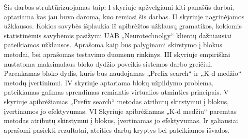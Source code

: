 Šis darbas struktūrizuojamas taip:
I skyriuje apžvelgiami kiti panašūs darbai, aptariama kas jau buvo daroma, kuo remiasi šis darbas.
II skyriuje nagrinėjamos užklausos.
Kokios savybės išplaukia iš apibrėžtos užklausų gramatikos, kokiomis statistinėmis savybėmis pasižymi UAB „Neurotechnolgy“ klientų dažniausiai pateikiamos užklausos.
Aprašoma kaip bus palyginami skirstymo į blokus metodai, bei aprašomas testavimo duomenų rinkinys.
III skyriuje empiriškai nustatoma maksimalaus bloko dydžio poveikis sistemos darbo greičiui.
Parenkamas bloko dydis, kuris bus naudojamas „Prefix search“ ir „K-d medžio“ metodų įvertinimui.
IV skyriuje aptariama blokų užpildymo problema, pateikiamas galimas sprendimas remiantis virtualios atminties principais.
V skyriuje apibrėžiamas „Prefix search“ metodas atributų skirstymui į blokus, įvertinamos jo efektyvumas.
VI Skyriuje apibrėžiamas „K-d medžiu“ paremtas metodas atributų skirstymui į blokus, įvertinamas jo efektyvumas.
Ir galiausiai aprašomi pasiekti rezultatai, ateities darbų kryptys bei pateikiamos išvados.


